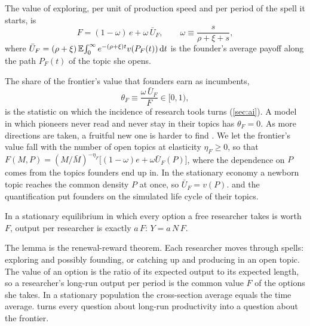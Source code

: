 \begin{lemma}\label{lem:frontier}
The value of exploring, per unit of production speed and per period of the
spell it starts, is
\begin{equation}\label{eq:F}
F=(1-\omega)\,e+\omega\,\bar U_F,\qquad \omega\equiv\frac{s}{\rho+\xi+s},
\end{equation}
where $\bar U_F=(\rho+\xi)\,\mathbb{E}\!\int_0^\infty e^{-(\rho+\xi)t}v(P_F(t))\,\mathrm{d} t$ is
the founder's average payoff along the path $P_F(t)$ of the topic she opens.
\end{lemma}

The share of the frontier's value that founders earn as incumbents,
\begin{equation}\label{eq:thetaF}
\theta_F\equiv\frac{\omega\,\bar U_F}{F}\in[0,1),
\end{equation}
is the statistic on which the incidence of research tools turns
(\cref{sec:ai}). A model in which pioneers never read and never stay in their
topics has $\theta_F=0$. As more directions are taken, a fruitful new one is
harder to find \citep{kortum1997,bloometal2020}. We let the frontier's value
fall with the number of open topics at elasticity $\eta_F\ge0$, so that
$F(M,P)=(M/\bar M)^{-\eta_F}\big[(1-\omega)e+\omega\bar U_F(P)\big]$, where the
dependence on $P$ comes from the topics founders end up in. In the stationary
economy a newborn topic reaches the common density $P$ at once, so
$\bar U_F=v(P)$.  and the quantification put founders on the
simulated life cycle of their topics.

\begin{lemma}\label{lem:little}
In a stationary equilibrium in which every option a free researcher takes is
worth $F$, output per researcher is exactly $a\,F$: $Y=a\,N\,F$.
\end{lemma}

The lemma is the renewal-reward theorem. Each researcher moves through
spells: exploring and possibly founding, or catching up and producing in an
open topic. The value of an option is the ratio of its expected output to its
expected length, so a researcher's long-run output per period is the common
value $F$ of the options she takes. In a stationary population the
cross-section average equals the time average.  turns every
question about long-run productivity into a question about the frontier.

